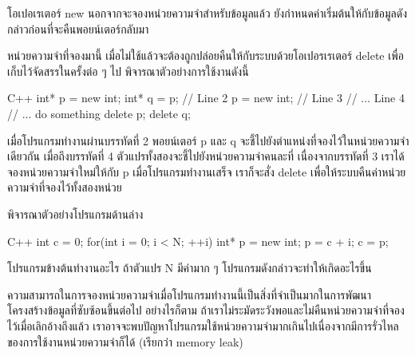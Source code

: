 โอ{\wbr}เปอเรเตอร์ {\ct new} นอกจาก{\wbr}จะ{\wbr}จอง{\wbr}หน่วยความจำ{\wbr}สำหรับ{\wbr}ข้อมูล{\wbr}แล้ว{\wbr}
ยัง{\wbr}กำหนด{\wbr}ค่า{\wbr}เริ่มต้น{\wbr}ให้{\wbr}กับ{\wbr}ข้อมูล{\wbr}ดังกล่าว{\wbr}ก่อน{\wbr}ที่{\wbr}จะ{\wbr}คืน{\wbr}พอยน์เตอร์{\wbr}กลับ{\wbr}มา{\wbr}

หน่วยความจำ{\wbr}ที่{\wbr}จอง{\wbr}มา{\wbr}นี้ เมื่อ{\wbr}ไม่{\wbr}ใช้{\wbr}แล้ว{\wbr}จะ{\wbr}ต้อง{\wbr}ถูก{\wbr}ปล่อย{\wbr}คืน{\wbr}ให้{\wbr}กับ{\wbr}ระบบ{\wbr}ด้วย{\wbr}โอ{\wbr}เป{\wbr}อร{\wbr}เรเตอร์ {\ct
  delete} เพื่อ{\wbr}เก็บ{\wbr}ไว้{\wbr}จัดสรร{\wbr}ใน{\wbr}ครั้ง{\wbr}ต่อ ๆ ไป  พิจารณา{\wbr}ตัวอย่าง{\wbr}การ{\wbr}ใช้{\wbr}งาน{\wbr}ดังนี้{\wbr}

\latintext
\begin{codelist}{C++}{}
int* p = new int;
int* q = p;           // Line 2
p = new int;          // Line 3
// ...                   Line 4
// ... do something
delete p;
delete q;
\end{codelist}
\thaitext

เมื่อ{\wbr}โปรแกรม{\wbr}ทำงาน{\wbr}ผ่าน{\wbr}บรรทัด{\wbr}ที่ 2 พอยน์เตอร์ {\ct p} และ {\ct q}
จะ{\wbr}ชี้{\wbr}ไป{\wbr}ยัง{\wbr}ตำแหน่ง{\wbr}ที่{\wbr}จอง{\wbr}ไว้{\wbr}ใน{\wbr}หน่วยความจำ{\wbr}เดียวกัน เมื่อ{\wbr}ถึง{\wbr}บรรทัด{\wbr}ที่ 4
ตัวแปร{\wbr}ทั้ง{\wbr}สอง{\wbr}จะ{\wbr}ชี้{\wbr}ไป{\wbr}ยัง{\wbr}หน่วยความจำ{\wbr}คน{\wbr}ละ{\wbr}ที่ เนื่องจาก{\wbr}บรรทัด{\wbr}ที่ 3
เรา{\wbr}ได้{\wbr}จอง{\wbr}หน่วยความจำ{\wbr}ใหม่{\wbr}ให้{\wbr}กับ {\ct p} เมื่อ{\wbr}โปรแกรม{\wbr}ทำงาน{\wbr}เสร็จ เรา{\wbr}ก็{\wbr}จะ{\wbr}สั่ง {\ct
  delete} เพื่อให้{\wbr}ระบบ{\wbr}คืน{\wbr}ค่า{\wbr}หน่วยความจำ{\wbr}ที่{\wbr}จอง{\wbr}ไว้{\wbr}ทั้ง{\wbr}สอง{\wbr}หน่วย{\wbr}

พิจารณา{\wbr}ตัวอย่าง{\wbr}โปรแกรม{\wbr}ด้าน{\wbr}ล่าง{\wbr}

\latintext
\begin{codelist}{C++}{}
int c = 0;
for(int i = 0; i < N; ++i) {
  int* p = new int;
  p = c + i;
  c = p;
}
\end{codelist}
\thaitext

\begin{quiz}{}
โปรแกรม{\wbr}ข้างต้น{\wbr}ทำงาน{\wbr}อะไร  ถ้า{\wbr}ตัวแปร {\ct N} มี{\wbr}ค่า{\wbr}มาก ๆ โปรแกรม{\wbr}ดังกล่าว{\wbr}จะ{\wbr}ทำ{\wbr}ให้{\wbr}เกิด{\wbr}อะไร{\wbr}ขึ้น{\wbr}
\end{quiz}

ความ{\wbr}สามารถ{\wbr}ใน{\wbr}การ{\wbr}จอง{\wbr}หน่วยความจำ{\wbr}เมื่อ{\wbr}โปรแกรม{\wbr}ทำงาน{\wbr}นี้{\wbr}เป็น{\wbr}สิ่ง{\wbr}ที่{\wbr}จำเป็น{\wbr}มาก{\wbr}ใน{\wbr}การ{\wbr}พัฒนา{\wbr}โครงสร้าง{\wbr}ข้อมูล{\wbr}ที่{\wbr}ซับซ้อน{\wbr}ขึ้น{\wbr}ต่อไป{\wbr}
อย่างไรก็ตาม ถ้า{\wbr}เรา{\wbr}ไม่{\wbr}ระมัดระวัง{\wbr}พอ{\wbr}และ{\wbr}ไม่{\wbr}คืน{\wbr}หน่วยความจำ{\wbr}ที่{\wbr}จอง{\wbr}ไว้{\wbr}เมื่อ{\wbr}เลิก{\wbr}อ้าง{\wbr}ถึง{\wbr}แล้ว{\wbr}
เรา{\wbr}อาจ{\wbr}จะ{\wbr}พบ{\wbr}ปัญหา{\wbr}โปรแกรม{\wbr}ใช้{\wbr}หน่วยความจำ{\wbr}มาก{\wbr}เกิน{\wbr}ไป{\wbr}เนื่องจาก{\wbr}มี{\wbr}การ{\wbr}รั่วไหล{\wbr}ของ{\wbr}การ{\wbr}ใช้{\wbr}งาน{\wbr}หน่วยความจำ{\wbr}ก็ได้{\wbr}
(เรียก{\wbr}ว่า memory leak)

